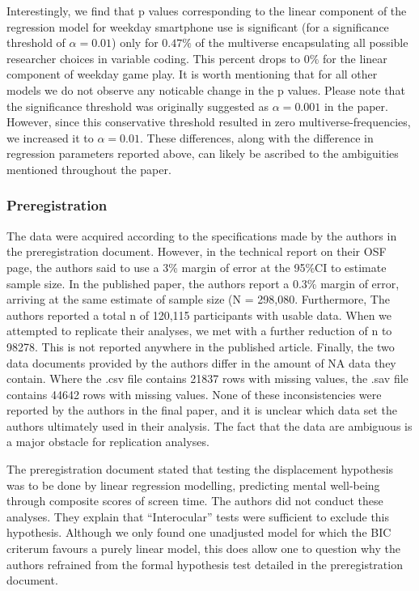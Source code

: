 \documentclass[man]{apa6}
\theoremstyle{definition}
\theoremstyle{definition}
\theoremstyle{definition}
\theoremstyle{remark}
\begin{document}
Interestingly, we find that p values corresponding to the linear
component of the regression model for weekday smartphone use is
significant (for a significance threshold of \(\alpha = 0.01\)) only for
\(0.47\%\) of the multiverse encapsulating all possible researcher
choices in variable coding. This percent drops to \(0\%\) for the linear
component of weekday game play. It is worth mentioning that for all
other models we do not observe any noticable change in the p values.
Please note that the significance threshold was originally suggested as
\(\alpha = 0.001\) in the paper. However, since this conservative
threshold resulted in zero multiverse-frequencies, we increased it to
\(\alpha = 0.01\). These differences, along with the difference in
regression parameters reported above, can likely be ascribed to the
ambiguities mentioned throughout the paper.

\hypertarget{preregistration}{%
\subsubsection{Preregistration}\label{preregistration}}

The data were acquired according to the specifications made by the
authors in the preregistration document. However, in the technical
report on their OSF page, the authors said to use a 3\% margin of error
at the 95\%CI to estimate sample size. In the published paper, the
authors report a 0.3\% margin of error, arriving at the same estimate of
sample size (N = 298,080. Furthermore, The authors reported a total n of
120,115 participants with usable data. When we attempted to replicate
their analyses, we met with a further reduction of n to 98278. This is
not reported anywhere in the published article. Finally, the two data
documents provided by the authors differ in the amount of NA data they
contain. Where the .csv file contains 21837 rows with missing values,
the .sav file contains 44642 rows with missing values. None of these
inconsistencies were reported by the authors in the final paper, and it
is unclear which data set the authors ultimately used in their analysis.
The fact that the data are ambiguous is a major obstacle for replication
analyses.

The preregistration document stated that testing the displacement
hypothesis was to be done by linear regression modelling, predicting
mental well-being through composite scores of screen time. The authors
did not conduct these analyses. They explain that \enquote{Interocular}
tests were sufficient to exclude this hypothesis. Although we only found
one unadjusted model for which the BIC criterum favours a purely linear
model, this does allow one to question why the authors refrained from
the formal hypothesis test detailed in the preregistration document.
\end{document}
